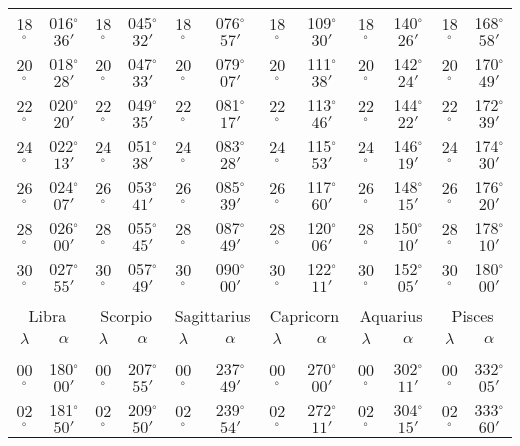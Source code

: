 \begin{table}
{\begin{tabular}{cc|cc|cc|cc|cc|cc}
18$^\circ$ & 016$^\circ$$36'$ & 18$^\circ$ & 045$^\circ$$32'$ & 18$^\circ$ & 076$^\circ$$57'$ & 18$^\circ$ & 109$^\circ$$30'$ & 18$^\circ$ & 140$^\circ$$26'$ & 18$^\circ$ & 168$^\circ$$58'$\\
20$^\circ$ & 018$^\circ$$28'$ & 20$^\circ$ & 047$^\circ$$33'$ & 20$^\circ$ & 079$^\circ$$07'$ & 20$^\circ$ & 111$^\circ$$38'$ & 20$^\circ$ & 142$^\circ$$24'$ & 20$^\circ$ & 170$^\circ$$49'$\\
22$^\circ$ & 020$^\circ$$20'$ & 22$^\circ$ & 049$^\circ$$35'$ & 22$^\circ$ & 081$^\circ$$17'$ & 22$^\circ$ & 113$^\circ$$46'$ & 22$^\circ$ & 144$^\circ$$22'$ & 22$^\circ$ & 172$^\circ$$39'$\\
24$^\circ$ & 022$^\circ$$13'$ & 24$^\circ$ & 051$^\circ$$38'$ & 24$^\circ$ & 083$^\circ$$28'$ & 24$^\circ$ & 115$^\circ$$53'$ & 24$^\circ$ & 146$^\circ$$19'$ & 24$^\circ$ & 174$^\circ$$30'$\\
26$^\circ$ & 024$^\circ$$07'$ & 26$^\circ$ & 053$^\circ$$41'$ & 26$^\circ$ & 085$^\circ$$39'$ & 26$^\circ$ & 117$^\circ$$60'$ & 26$^\circ$ & 148$^\circ$$15'$ & 26$^\circ$ & 176$^\circ$$20'$\\
28$^\circ$ & 026$^\circ$$00'$ & 28$^\circ$ & 055$^\circ$$45'$ & 28$^\circ$ & 087$^\circ$$49'$ & 28$^\circ$ & 120$^\circ$$06'$ & 28$^\circ$ & 150$^\circ$$10'$ & 28$^\circ$ & 178$^\circ$$10'$\\
30$^\circ$ & 027$^\circ$$55'$ & 30$^\circ$ & 057$^\circ$$49'$ & 30$^\circ$ & 090$^\circ$$00'$ & 30$^\circ$ & 122$^\circ$$11'$ & 30$^\circ$ & 152$^\circ$$05'$ & 30$^\circ$ & 180$^\circ$$00'$\\
\multicolumn{12}{c}{}\\
\multicolumn{2}{c}{Libra}\vline & \multicolumn{2}{c}{Scorpio} \vline& \multicolumn{2}{c}{Sagittarius} \vline& \multicolumn{2}{c}{Capricorn}\vline &
\multicolumn{2}{c}{Aquarius}\vline & \multicolumn{2}{c}{Pisces}\\\hline
$\lambda$& $\alpha$& $\lambda$& $\alpha$& $\lambda$& $\alpha$& $\lambda$& $\alpha$& $\lambda$& $\alpha$& $\lambda$& $\alpha$\\\hline
&&&&&&&&&&&\\[-2ex]
00$^\circ$ & 180$^\circ$$00'$ & 00$^\circ$ & 207$^\circ$$55'$ & 00$^\circ$ & 237$^\circ$$49'$ & 00$^\circ$ & 270$^\circ$$00'$ &  00$^\circ$ & 302$^\circ$$11'$ & 00$^\circ$ & 332$^\circ$$05'$\\
02$^\circ$ & 181$^\circ$$50'$ & 02$^\circ$ & 209$^\circ$$50'$ & 02$^\circ$ & 239$^\circ$$54'$ & 02$^\circ$ & 272$^\circ$$11'$ &  02$^\circ$ & 304$^\circ$$15'$ & 02$^\circ$ & 333$^\circ$$60'$\\

\end{tabular}}
\end{table}

